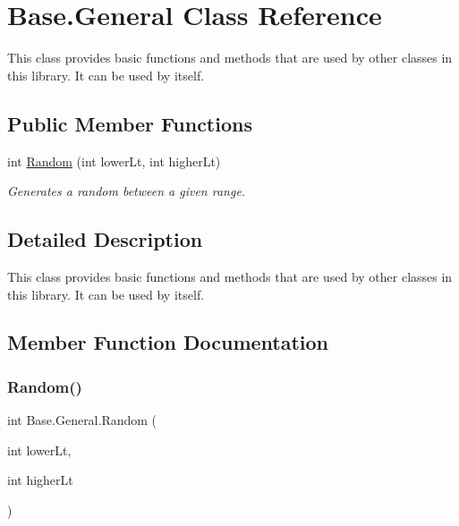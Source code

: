 \hypertarget{class_base_1_1_general}{}\section{Base.\+General Class Reference}
\label{class_base_1_1_general}


This class provides basic functions and methods that are used by other classes in this library. It can be used by itself.  


\subsection*{Public Member Functions}
\begin{DoxyCompactItemize}
\item 
int \mbox{\hyperlink{class_base_1_1_general_af2ac8ca13b92d4b3f8c5b801fcb55e7b}{Random}} (int lower\+Lt, int higher\+Lt)
\begin{DoxyCompactList}\small\item\em Generates a random between a given range. \end{DoxyCompactList}\end{DoxyCompactItemize}


\subsection{Detailed Description}
This class provides basic functions and methods that are used by other classes in this library. It can be used by itself. 



\subsection{Member Function Documentation}
\mbox{\label{class_base_1_1_general_af2ac8ca13b92d4b3f8c5b801fcb55e7b}} 
\subsubsection{\texorpdfstring{Random()}{Random()}}
{\footnotesize\ttfamily int Base.\+General.\+Random (\begin{DoxyParamCaption}\item[{int}]{lower\+Lt,  }\item[{int}]{higher\+Lt }\end{DoxyParamCaption})}



